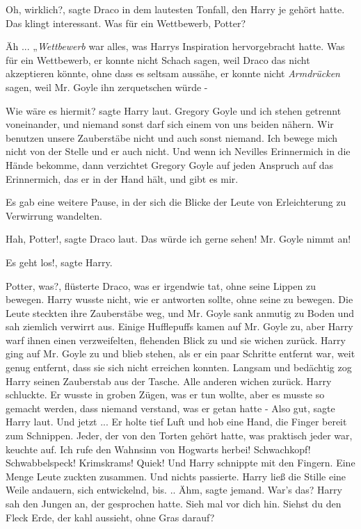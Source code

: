 \glqq Oh, wirklich?\grqq{}, sagte Draco in dem lautesten Tonfall, den Harry je
gehört hatte. \glqq Das klingt interessant. Was für ein Wettbewerb,
Potter?\grqq{}

Äh ... „\emph{Wettbewerb}\grqq{} war alles, was Harrys Inspiration
hervorgebracht hatte. Was für ein Wettbewerb, er konnte nicht \glqq
Schach\grqq{} sagen, weil Draco das nicht akzeptieren könnte, ohne dass es
seltsam aussähe, er konnte nicht \glqq \emph{Armdrücken}\grqq{} sagen, weil Mr.
Goyle ihn zerquetschen würde -

\glqq Wie wäre es hiermit?\grqq{} sagte Harry laut. \glqq Gregory Goyle und ich
stehen getrennt voneinander, und niemand sonst darf sich einem von uns beiden
nähern. Wir benutzen unsere Zauberstäbe nicht und auch sonst niemand. Ich bewege
mich nicht von der Stelle und er auch nicht. Und wenn ich Nevilles Erinnermich
in die Hände bekomme, dann verzichtet Gregory Goyle auf jeden Anspruch auf das
Erinnermich, das er in der Hand hält, und gibt es mir.\grqq{}

Es gab eine weitere Pause, in der sich die Blicke der Leute von Erleichterung zu
Verwirrung wandelten.

\glqq Hah, Potter!\grqq{}, sagte Draco laut. \glqq Das würde ich gerne sehen!
Mr. Goyle nimmt an!\grqq{}

\glqq Es geht los!\grqq{}, sagte Harry.

\glqq Potter, was?\grqq{}, flüsterte Draco, was er irgendwie tat, ohne seine
Lippen zu bewegen. Harry wusste nicht, wie er antworten sollte, ohne seine zu
bewegen. Die Leute steckten ihre Zauberstäbe weg, und Mr. Goyle sank anmutig zu
Boden und sah ziemlich verwirrt aus. Einige Hufflepuffs kamen auf Mr. Goyle zu,
aber Harry warf ihnen einen verzweifelten, flehenden Blick zu und sie wichen
zurück. Harry ging auf Mr. Goyle zu und blieb stehen, als er ein paar Schritte
entfernt war, weit genug entfernt, dass sie sich nicht erreichen konnten.
Langsam und bedächtig zog Harry seinen Zauberstab aus der Tasche. Alle anderen
wichen zurück. Harry schluckte. Er wusste in groben Zügen, was er tun wollte,
aber es musste so gemacht werden, dass niemand verstand, was er getan hatte -
\glqq Also gut\grqq{}, sagte Harry laut. \glqq Und jetzt ...\grqq{} Er holte
tief Luft und hob eine Hand, die Finger bereit zum Schnippen. Jeder, der von den
Torten gehört hatte, was praktisch jeder war, keuchte auf. \glqq Ich rufe den
Wahnsinn von Hogwarts herbei! Schwachkopf! Schwabbelspeck! Krimskrams!
Quiek!\grqq{} Und Harry schnippte mit den Fingern. Eine Menge Leute zuckten
zusammen. Und nichts passierte. Harry ließ die Stille eine Weile andauern, sich
entwickelnd, bis. .. \glqq Ähm\grqq{}, sagte jemand. \glqq War's das?\grqq{}
Harry sah den Jungen an, der gesprochen hatte. \glqq Sieh mal vor dich hin.
Siehst du den Fleck Erde, der kahl aussieht, ohne Gras darauf?\grqq{}

